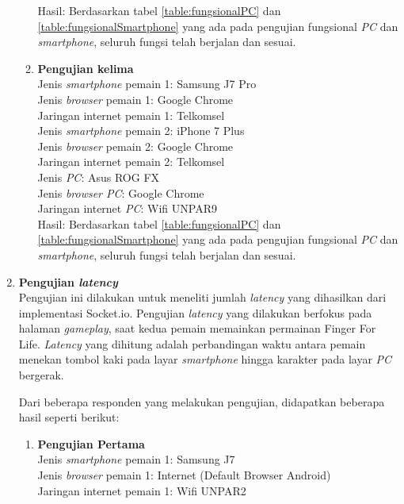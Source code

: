 \begin{enumerate}
\begin{enumerate}
		Hasil: Berdasarkan tabel \ref{table:fungsionalPC} dan \ref{table:fungsionalSmartphone} yang ada pada pengujian fungsional \textit{PC} dan \textit{smartphone}, seluruh fungsi telah berjalan dan sesuai.
		
		\item \textbf{Pengujian kelima} \\
		Jenis \textit{smartphone} pemain 1: Samsung J7 Pro\\
		Jenis \textit{browser} pemain 1: Google Chrome\\
		Jaringan internet pemain 1: Telkomsel\\
		
		Jenis \textit{smartphone} pemain 2: iPhone 7 Plus\\
		Jenis \textit{browser} pemain 2: Google Chrome\\
		Jaringan internet pemain 2: Telkomsel\\
		
		Jenis \textit{PC}: Asus ROG FX\\
		Jenis \textit{browser PC}: Google Chrome\\
		Jaringan internet \textit{PC}: Wifi UNPAR9\\
		
		Hasil: Berdasarkan tabel \ref{table:fungsionalPC} dan \ref{table:fungsionalSmartphone} yang ada pada pengujian fungsional \textit{PC} dan \textit{smartphone}, seluruh fungsi telah berjalan dan sesuai.
	\end{enumerate}
	
	
	\item \textbf{Pengujian \textit{latency}} \\
	Pengujian ini dilakukan untuk meneliti jumlah \textit{latency} yang dihasilkan dari implementasi Socket.io. Pengujian \textit{latency} yang dilakukan berfokus pada halaman \textit{gameplay}, saat kedua pemain memainkan permainan Finger For Life. \textit{Latency} yang dihitung adalah perbandingan waktu antara pemain menekan tombol kaki pada layar \textit{smartphone} hingga karakter pada layar \textit{PC} bergerak. 
	
	
	
	Dari beberapa responden yang melakukan pengujian, didapatkan beberapa hasil seperti berikut:
	
	\begin{enumerate}
		\item \textbf{Pengujian Pertama} \\ 
		Jenis \textit{smartphone} pemain 1: Samsung J7\\
		Jenis \textit{browser} pemain 1: Internet (Default Browser Android)\\
		Jaringan internet pemain 1: Wifi UNPAR2\\
		

\end{enumerate}
\end{enumerate}
